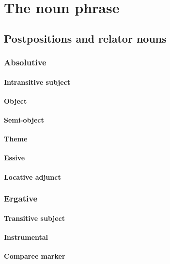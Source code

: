 \chapter{The noun phrase}

\section{Postpositions and relator nouns}

\subsection{Absolutive} \label{sec:absolutive}
\subsubsection{Intransitive subject}
\subsubsection{Object}
\subsubsection{Semi-object}
\subsubsection{Theme}
\subsubsection{Essive} \label{sec:essive.abs}
\subsubsection{Locative adjunct}

\subsection{Ergative} \label{sec:erg.kW}
\subsubsection{Transitive subject} \label{sec:A.kW}
\subsubsection{Instrumental} \label{sec:instr.kW}
\subsubsection{Comparee marker}
